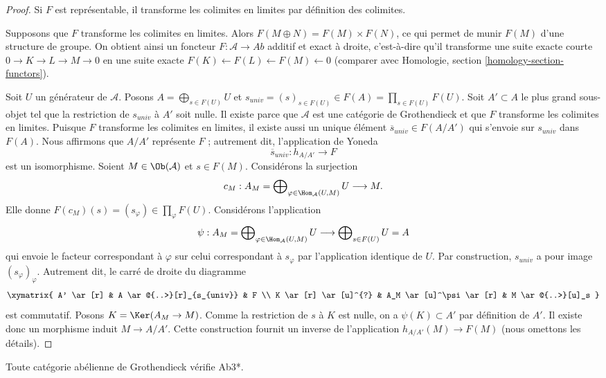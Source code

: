 \begin{proof}
Si $F$ est représentable, il transforme les colimites en limites par
définition des colimites.

\medskip\noindent
Supposons que $F$ transforme les colimites en limites. Alors
$F(M \oplus N) = F(M) \times F(N)$, ce qui permet de munir $F(M)$ d'une
structure de groupe. On obtient ainsi un foncteur
$F : \mathcal{A} \to \textit{Ab}$ additif et exact à droite,
c'est-à-dire qu'il transforme une suite exacte courte
$0 \to K \to L \to M \to 0$ en une suite exacte
$F(K) \leftarrow F(L) \leftarrow F(M) \leftarrow 0$ (comparer avec
Homologie, section \ref{homology-section-functors}).

\medskip\noindent
Soit $U$ un générateur de $\mathcal{A}$. Posons
$A = \bigoplus_{s \in F(U)} U$ et
$s_{univ} = (s)_{s \in F(U)} \in F(A) = \prod_{s \in F(U)} F(U)$.
Soit $A' \subset A$ le plus grand sous-objet tel que la restriction de
$s_{univ}$ à $A'$ soit nulle. Il existe parce que $\mathcal{A}$ est une
catégorie de Grothendieck et que $F$ transforme les colimites en limites.
Puisque $F$ transforme les colimites en limites, il existe aussi un unique
élément $\overline{s}_{univ} \in F(A/A')$ qui s'envoie sur $s_{univ}$ dans
$F(A)$.
Nous affirmons que $A/A'$ représente $F$ ; autrement dit, l'application de
Yoneda
$$
\overline{s}_{univ} : h_{A/A'} \longrightarrow F
$$
est un isomorphisme. Soient $M \in \Ob(\mathcal{A})$ et $s \in F(M)$.
Considérons la surjection
$$
c_M :
A_M = \bigoplus\nolimits_{\varphi \in \Hom_\mathcal{A}(U, M)} U
\longrightarrow
M.
$$
Elle donne $F(c_M)(s) = (s_\varphi) \in \prod_\varphi F(U)$.
Considérons l'application
$$
\psi :
A_M = \bigoplus\nolimits_{\varphi \in \Hom_\mathcal{A}(U, M)} U
\longrightarrow
\bigoplus\nolimits_{s \in F(U)} U = A
$$
qui envoie le facteur correspondant à $\varphi$ sur celui correspondant à
$s_\varphi$ par l'application identique de $U$. Par construction, $s_{univ}$
a pour image $(s_\varphi)_\varphi$. Autrement dit, le carré de droite du
diagramme
$$
\xymatrix{
A' \ar[r] &
A \ar@{..>}[r]_{s_{univ}} & F \\
K \ar[r] \ar[u]^{?} & A_M \ar[u]^\psi \ar[r] &
M \ar@{..>}[u]_s
}
$$
est commutatif. Posons $K = \Ker(A_M \to M)$. Comme la restriction de $s$
à $K$ est nulle, on a $\psi(K) \subset A'$ par définition de $A'$. Il existe
donc un morphisme induit $M \to A/A'$. Cette construction fournit un inverse
de l'application $h_{A/A'}(M) \to F(M)$ (nous omettons les détails).
\end{proof}

\begin{lemma}
\label{lemma-grothendieck-products}
Toute catégorie abélienne de Grothendieck vérifie Ab3*.
\end{lemma}

